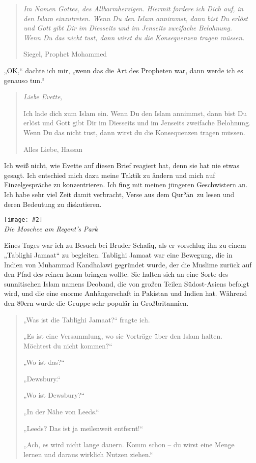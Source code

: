\documentclass[12pt]{memoir}
\def\´{ʾ} %
\def \Quran{Qur\-\´ān} %
\newcommand{\img}[3]{\begin{center}%
\texttt{[image: \#2]}\\{\small\em#3}%
\end{center}}
\begin{document}
\begin{quote}
\em
Im Namen Gottes, des Allbarmherzigen.
Hiermit fordere ich Dich auf, in den Islam einzutreten.
Wenn Du den Islam annimmst, dann bist Du erlöst
und Gott gibt Dir im Diesseits und im Jenseits zweifache Belohnung.
Wenn Du das nicht tust, dann wirst du die Konsequenzen tragen müssen.

Siegel, Prophet Mohammed
\end{quote}

„OK,“ dachte ich mir, „wenn das die Art des Propheten war,
dann werde ich es genauso tun.“

\begin{quote}
\em
Liebe Evette,

Ich lade dich zum Islam ein.
Wenn Du den Islam annimmst,
dann bist Du erlöst und Gott gibt Dir im Diesseits
und im Jenseits zweifache Belohnung.
Wenn Du das nicht tust, dann wirst du die Konsequenzen tragen müssen.

Alles Liebe,
Hassan
\end{quote}

Ich weiß nicht, wie Evette auf diesen Brief reagiert hat,
denn sie hat nie etwas gesagt.
Ich entschied mich dazu meine Taktik zu ändern
und mich auf Einzelgespräche zu konzentrieren.
Ich fing mit meinen jüngeren Geschwistern an.
Ich habe sehr viel Zeit damit verbracht,
Verse aus dem \Quran\ zu lesen und deren Bedeutung zu diskutieren.

\img{scale=0.4}{Hassan_in_Regents_Park_Mosque.jpg}
{Die Moschee am Regent’s Park}

Eines Tages war ich zu Besuch bei Bruder Schafiq,
als er vorschlug ihn zu einem „Tablighi Jamaat“ zu begleiten.
Tablighi Jamaat war eine Bewegung,
die in Indien von Muhammad Kandhalawi gegründet wurde,
der die Muslime zurück auf den Pfad des reinen Islam bringen wollte.
Sie halten sich an eine Sorte des sunnitischen Islam namens Deoband,
die von großen Teilen Südost-Asiens befolgt wird,
und die eine enorme Anhängerschaft in Pakistan und Indien hat.
Während den 80ern wurde die Gruppe sehr populär in Großbritannien.

\begin{quote}
„Was ist die Tablighi Jamaat?“ fragte ich.

„Es ist eine Versammlung, wo sie Vorträge über den Islam halten.
Möchtest du nicht kommen?“

„Wo ist das?“

„Dewsbury.“

„Wo ist Dewsbury?“

„In der Nähe von Leeds.“

„Leeds? Das ist ja meilenweit entfernt!“

„Ach, es wird nicht lange dauern. Komm schon –
du wirst eine Menge lernen und daraus wirklich Nutzen ziehen.“
\end{quote}
\end{document}
